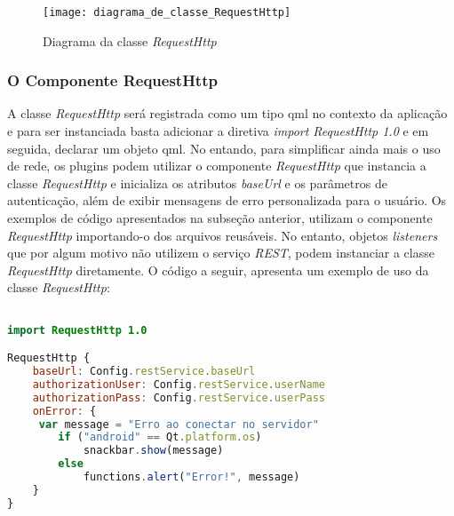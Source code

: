 \begin{figure}[h]
	\texttt{[image: diagrama\_de\_classe\_RequestHttp]}
	\centering
	\caption{Diagrama da classe \textit{RequestHttp}}
\end{figure}

\subsubsection{O Componente RequestHttp}\label{sec:solucao-desenvolvida}
A classe \textit{RequestHttp} será registrada como um tipo qml no contexto da aplicação e para ser instanciada basta adicionar a diretiva \textit{import RequestHttp 1.0} e em seguida, declarar um objeto qml. No entando, para simplificar ainda mais o uso de rede, os plugins podem utilizar o componente \textit{RequestHttp} que instancia a classe \textit{RequestHttp} e inicializa os atributos \textit{baseUrl} e os parâmetros de autenticação, além de exibir mensagens de erro personalizada para o usuário. Os exemplos de código apresentados na subseção anterior, utilizam o componente \textit{RequestHttp} importando-o dos arquivos reusáveis. No entanto, objetos \textit{listeners} que por algum motivo não utilizem o serviço \textit{REST}, podem instanciar a classe \textit{RequestHttp} diretamente. O código a seguir, apresenta um exemplo de uso da classe \textit{RequestHttp}:

\begin{center}
\begin{lstlisting}[language=qml]

import RequestHttp 1.0 

RequestHttp {
    baseUrl: Config.restService.baseUrl
    authorizationUser: Config.restService.userName
    authorizationPass: Config.restService.userPass
    onError: {
     var message = "Erro ao conectar no servidor"
        if ("android" == Qt.platform.os)
	        snackbar.show(message)
		else
	        functions.alert("Error!", message)
    }
}
\end{lstlisting}
\end{center}


